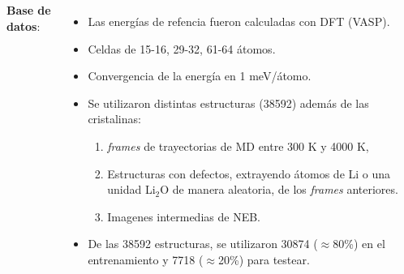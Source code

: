 \documentclass[aspectratio=169]{beamer}
\let\oldtextbf\textbf
\renewcommand{\textbf}[1]{\textcolor{nordblue}{\oldtextbf{#1}}}
\begin{document}
\begin{frame}
\begin{columns}
            \pause 

            \textbf{Base de datos}:
            \begin{itemize}
                \item Las energías de refencia fueron calculadas con DFT (VASP).
                \item Celdas de 15-16, 29-32, 61-64 átomos.
                \item Convergencia de la energía en 1 meV/átomo.

                \pause

                \item Se utilizaron distintas estructuras (38592) además de las 
                    cristalinas:
                    \begin{enumerate}
                        \item \textit{frames} de trayectorias de MD entre 300 K
                            y 4000 K,
                        \item Estructuras con defectos, extrayendo átomos de Li o
                            una unidad Li$_2$O de manera aleatoria, de los 
                            \textit{frames} anteriores.
                        \item Imagenes intermedias de NEB.
                    \end{enumerate}
                \item De las 38592 estructuras, se utilizaron 30874 
                    ($\approx$80\%) en el entrenamiento y 7718 ($\approx$20\%) 
                    para testear.
            \end{itemize}
        \end{columns}

    \end{frame}
    
\end{document}
